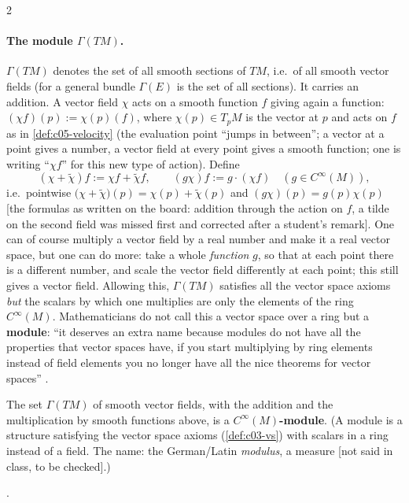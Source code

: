 \begin{paracol}{2}
\paragraph{The module $\Gamma(TM)$.} $\Gamma(TM)$ denotes the set of all smooth sections of $TM$, i.e.\ of all smooth vector fields (for a general bundle $\Gamma(E)$ is the set of all sections). It carries an addition. A vector field $\chi$ acts on a smooth function $f$ giving again a function: $(\chi f)(p):=\chi(p)(f)$, where $\chi(p)\in T_pM$ is the vector at $p$ and acts on $f$ as in \cref{def:c05-velocity}
(the evaluation point ``jumps in between''; a vector at a point gives a number, a vector field at every point gives a smooth function; one is writing ``$\chi f$'' for this new type of action). Define
\[
  (\chi+\tilde\chi)f:=\chi f+\tilde\chi f,\qquad(g\chi)f:=g\cdot(\chi f)\quad(g\in C^\infty(M)),
\]
i.e.\ pointwise $\bigl(\chi+\tilde\chi\bigr)(p)=\chi(p)+\tilde\chi(p)$ and $(g\chi)(p)=g(p)\chi(p)$ [the formulas as written on the board: addition through the action on $f$, a tilde on the second field was missed first and corrected after a student's remark]. One can of course multiply a vector field by a real number and make it a real vector space, but one can do more: take a whole \emph{function} $g$, so that at each point there is a different number, and scale the vector field differently at each point; this still gives a vector field.
Allowing this, $\Gamma(TM)$ satisfies all the vector space axioms \emph{but} the scalars by which one multiplies are only the elements of the ring $C^\infty(M)$. Mathematicians do not call this a vector space over a ring but a \textbf{module}: ``it deserves an extra name because modules do not have all the properties that vector spaces have, if you start multiplying by ring elements instead of field elements you no longer have all the nice theorems for vector spaces''
.

\begin{definition}\label{def:c06-module}
The set $\Gamma(TM)$ of smooth vector fields, with the addition and the multiplication by smooth functions above, is a \textbf{$C^\infty(M)$-module}. (A module is a structure satisfying the vector space axioms (\cref{def:c03-vs}) with scalars in a ring instead of a field. The name: the German/Latin \emph{modulus}, a measure [not said in class, to be checked].)
\end{definition}
.


\end{paracol}
